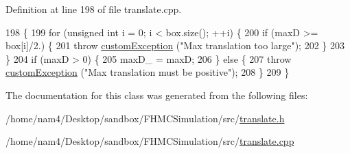 Definition at line 198 of file translate.\-cpp.


\begin{DoxyCode}
198                                                                                              \{
199     \textcolor{keywordflow}{for} (\textcolor{keywordtype}{unsigned} \textcolor{keywordtype}{int} i = 0; i < box.size(); ++i) \{
200         \textcolor{keywordflow}{if} (maxD >= box[i]/2.) \{
201             \textcolor{keywordflow}{throw} \hyperlink{classcustom_exception}{customException} (\textcolor{stringliteral}{"Max translation too large"});
202         \}
203     \}
204     \textcolor{keywordflow}{if} (maxD > 0) \{
205         maxD\_ = maxD;
206     \} \textcolor{keywordflow}{else} \{
207         \textcolor{keywordflow}{throw} \hyperlink{classcustom_exception}{customException} (\textcolor{stringliteral}{"Max translation must be positive"});
208     \}
209 \}
\end{DoxyCode}


The documentation for this class was generated from the following files\-:\begin{DoxyCompactItemize}
\item 
/home/nam4/\-Desktop/sandbox/\-F\-H\-M\-C\-Simulation/src/\hyperlink{translate_8h}{translate.\-h}\item 
/home/nam4/\-Desktop/sandbox/\-F\-H\-M\-C\-Simulation/src/\hyperlink{translate_8cpp}{translate.\-cpp}\end{DoxyCompactItemize}

